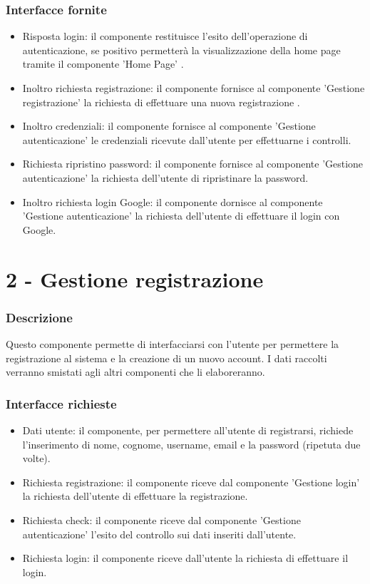 \documentclass[a4paper,12pt]{article}
\begin{document}
\subsubsection*{Interfacce fornite}
\begin{itemize} \setlength\itemsep{0.01em}
\item {\sffamily Risposta login}: il componente restituisce l'esito dell'operazione di autenticazione, se positivo permetterà la visualizzazione della home page tramite il componente 'Home Page' .
\item {\sffamily Inoltro richiesta registrazione}: il componente fornisce al componente 'Gestione registrazione' la richiesta di effettuare una nuova registrazione .
\item {\sffamily Inoltro credenziali}: il componente fornisce al componente 'Gestione autenticazione' le credenziali ricevute dall'utente per effettuarne i controlli.
\item {\sffamily Richiesta ripristino password}: il componente fornisce al componente 'Gestione autenticazione' la richiesta dell'utente di ripristinare la password.
\item {\sffamily Inoltro richiesta login Google}: il componente dornisce al componente 'Gestione autenticazione' la richiesta dell'utente di effettuare il login con Google.
\end{itemize}





\section*{2 - Gestione registrazione}
\subsubsection*{Descrizione}
Questo componente permette di interfacciarsi con l’utente per permettere la registrazione al sistema e la creazione di un nuovo account. I dati raccolti verranno smistati agli altri componenti che li elaboreranno.

\subsubsection*{Interfacce richieste}
\begin{itemize} \setlength\itemsep{0.01em}
\item {\sffamily Dati utente}: il componente, per permettere all'utente di registrarsi, richiede l'inserimento di nome, cognome, username, email e la password (ripetuta due volte).
\item {\sffamily Richiesta registrazione}: il componente riceve dal componente 'Gestione login' la richiesta dell'utente di effettuare la registrazione.
\item {\sffamily Richiesta check}: il componente riceve dal componente 'Gestione autenticazione' l'esito del controllo sui dati inseriti dall'utente.
\item {\sffamily Richiesta login}: il componente riceve dall'utente la richiesta di effettuare il login.
\end{itemize}
\end{document}
